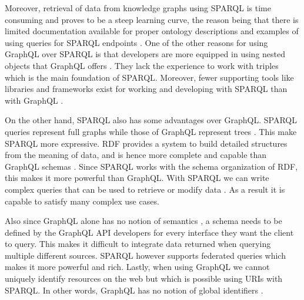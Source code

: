 Moreover, retrieval of data from knowledge graphs using SPARQL is time consuming and proves to be a steep learning curve, the reason being that there is limited documentation available for proper ontology descriptions and examples of using queries for SPARQL endpoints \cite{Angele2022}. One of the other reasons for using GraphQL over SPARQL is that developers are more equipped in using nested objects that GraphQL offers \cite{Taelman2018}. They lack the experience to work with triples which is the main foundation of SPARQL. Moreover, fewer supporting tools like libraries and frameworks exist for working and developing with SPARQL than with GraphQL \cite{Taelman2018}. 

On the other hand, SPARQL also has some advantages over GraphQL. SPARQL queries represent full graphs while those of GraphQL represent trees \cite{Taelman2018}. This make SPARQL more expressive. RDF provides a system to build detailed structures from the meaning of data, and is hence more complete and capable than GraphQL schemas \cite{Dresslar2019}. Since SPARQL works with the schema organization of RDF, this makes it more powerful than GraphQL. With SPARQL we can write complex queries that can be used to retrieve or modify data \cite{Angele2022}. As a result it is capable to satisfy many complex use cases.

Also since GraphQL alone has no notion of semantics \cite{Taelman2018}, a schema needs to be defined by the GraphQL API developers for every interface they want the client to query. This makes it difficult to integrate data returned when querying multiple different sources. SPARQL however supports federated queries which makes it more powerful and rich. Lastly, when using GraphQL we cannot uniquely identify resources on the web but which is possible using URIs with SPARQL. In other words, GraphQL has no notion of global identifiers \cite{Taelman2018}.